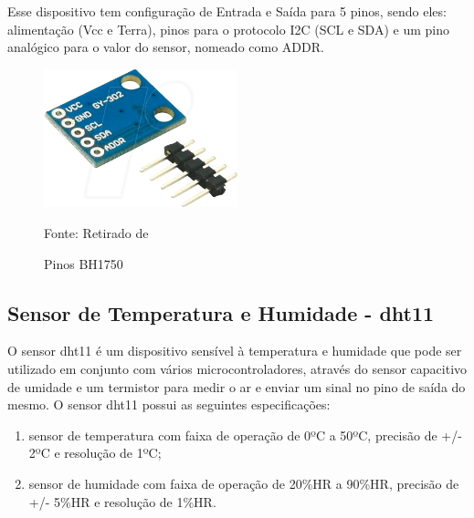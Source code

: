 \documentclass[../../layout.tex]{subfiles}
\begin{document}
\hspace*{3em}Esse dispositivo tem configuração de  Entrada e Saída para 5 pinos, sendo eles: alimentação (Vcc e Terra), pinos para o protocolo I2C (SCL e SDA) e um pino analógico para o valor do sensor, nomeado como ADDR.

\begin{figure}[H]
\centering
\caption{Pinos BH1750}
\includegraphics[width=0.5\textwidth]{assets/static/img/BH1750_pinout.jpg}
\label{fig:BH1750_pinout}

\begin{minipage}{0.5\textwidth}
\raggedright \footnotesize Fonte: Retirado de \cite{BH1750_shop} 
\end{minipage}
\end{figure}

\subsection{Sensor de Temperatura e Humidade - dht11}
\hspace*{3em}O sensor dht11 é um dispositivo sensível à temperatura e humidade que pode ser utilizado em conjunto com vários microcontroladores, através do sensor capacitivo de umidade e um termistor para medir o ar e enviar um sinal no pino de saída do mesmo. O sensor dht11 possui as seguintes especificações:
\begin{enumerate}[label=\alph*)]
\itemsep0em
    \item sensor de temperatura com faixa de operação de 0ºC a 50ºC, precisão de +/- 2ºC e resolução de 1ºC;
    \item sensor de humidade com faixa de operação de 20\%HR a 90\%HR, precisão de +/- 5\%HR e resolução de 1\%HR.
\end{enumerate}
\end{document}
